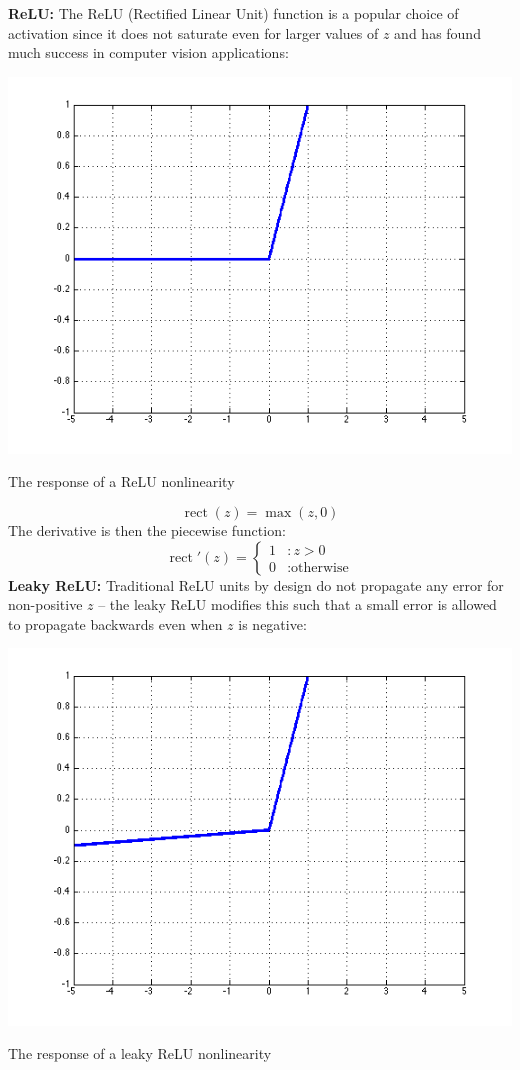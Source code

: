 \documentclass{tufte-handout}
\begin{document}
{$$ $$
\textbf{ReLU:} The ReLU (Rectified Linear Unit) function is a popular choice of activation since it does not saturate even for larger values of $z$ and has found much success in computer vision applications:
\begin{marginfigure}%
  \includegraphics[width=\linewidth]{graph_relu}
  \caption{The response of a ReLU nonlinearity}
  \label{fig:graph_relu}
\end{marginfigure}
$$\operatorname{rect}(z) = \operatorname{max}(z, 0)$$
The derivative is then the piecewise function:
\begin{displaymath}
    \operatorname{rect}'(z) = \left\{
     \begin{array}{cl}
       1 & : z > 0\\
       0 & : \text{otherwise}
     \end{array}
   \right.
\end{displaymath} 
\textbf{Leaky ReLU:} Traditional ReLU units by design do not propagate any error for non-positive $z$ -- the leaky ReLU modifies this such that a small error is allowed to propagate backwards even when $z$ is negative:

\begin{marginfigure}%
  \includegraphics[width=\linewidth]{graph_leaky}
  \caption{The response of a leaky ReLU nonlinearity}
  \label{fig:graph_leaky}
\end{marginfigure}

}
\end{document}
